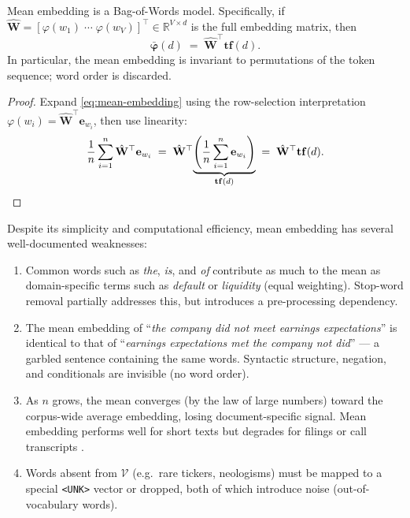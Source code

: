 \begin{deepdive}
\begin{proposition}
\label{thm:mean-embed-is-bow}
Mean embedding is a Bag-of-Words model.  Specifically, if
$\hat{\mathbf{W}} = [\varphi(w_1) \;\cdots\; \varphi(w_V)]^{\top}
\in \mathbb{R}^{V \times d}$ is the full embedding matrix, then
\[
  \bar{\boldsymbol{\varphi}}(d)
  \;=\;
  \hat{\mathbf{W}}^{\top} \mathbf{tf}(d).
\]
In particular, the mean embedding is invariant to permutations of the
token sequence; word order is discarded.
\end{proposition}
\begin{proof}
  Expand \eqref{eq:mean-embedding} using the row-selection
  interpretation $\varphi(w_i) = \hat{\mathbf{W}}^{\top}\mathbf{e}_{w_i}$,
  then use linearity:
  \[
    \frac{1}{n}\sum_{i=1}^n \hat{\mathbf{W}}^{\top}\mathbf{e}_{w_i}
    \;=\;
    \hat{\mathbf{W}}^{\top}
    \!\underbrace{\left(\frac{1}{n}\sum_{i=1}^n \mathbf{e}_{w_i}\right)}_{\mathbf{tf}(d)}
    \;=\;
    \hat{\mathbf{W}}^{\top}\mathbf{tf}(d). \qedhere
  \]
\end{proof}

Despite its simplicity and computational efficiency, mean embedding
has several well-documented weaknesses:
\begin{enumerate}
  \item Common words such as \emph{the}, \emph{is}, and \emph{of}
        contribute as much to the mean as domain-specific terms such as
        \emph{default} or \emph{liquidity} (equal weighting).
        Stop-word removal partially addresses this, but introduces a
        pre-processing dependency.
  \item The mean embedding of ``\emph{the company did not meet earnings
        expectations}'' is identical to that of ``\emph{earnings
        expectations met the company not did}'' --- a garbled sentence
        containing the same words.  Syntactic structure, negation, and
        conditionals are invisible (no word order).
  \item As $n$ grows, the mean converges (by the law of large numbers)
        toward the corpus-wide average embedding, losing
        document-specific signal.  Mean embedding performs well for
        short texts but degrades for filings or call transcripts
        \cite{reimers2019}. %
  \item Words absent from $\mathcal{V}$ (e.g.\ rare tickers,
        neologisms) must be mapped to a special \texttt{<UNK>} vector
        or dropped, both of which introduce noise (out-of-vocabulary
        words).
\end{enumerate}


\end{deepdive}
